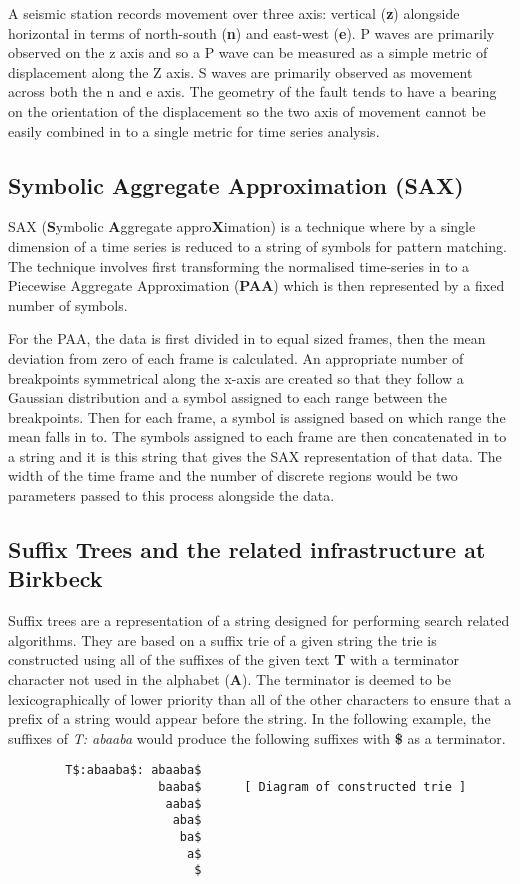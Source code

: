 \documentclass[11pt]{scrartcl}
\begin{document}
	A seismic station records movement over three axis: vertical (\textbf{z}) alongside horizontal in terms of north-south (\textbf{n}) and east-west (\textbf{e}).  P waves are primarily observed on the z axis and so a P wave can be measured as a simple metric of displacement along the Z axis.  S waves are primarily observed as movement across both the n and e axis.  The geometry of the fault tends to have a bearing on the orientation of the displacement so the two axis of movement cannot be easily combined in to a single metric for time series analysis.
	
\subsection{Symbolic Aggregate Approximation (SAX)}
	SAX (\textbf{S}ymbolic \textbf{A}ggregate appro\textbf{X}imation) \citep{sax} is a technique where by a single dimension of a time series is reduced to a string of symbols for pattern matching.  The technique involves first transforming the normalised time-series in to a Piecewise Aggregate Approximation (\textbf{PAA}) which is then represented by a fixed number of symbols.
	
	For the PAA, the data is first divided in to equal sized frames, then the mean deviation from zero of each frame is calculated.  An appropriate number of breakpoints symmetrical along the x-axis are created so that they follow a Gaussian distribution and a symbol assigned to each range between the breakpoints.  Then for each frame, a symbol is assigned based on which range the mean falls in to.  The symbols assigned to each frame are then concatenated in to a string and it is this string that gives the SAX representation of that data.  The width of the time frame and the number of discrete regions would be two parameters passed to this process alongside the data.
	
\subsection{Suffix Trees and the related infrastructure at Birkbeck}
	Suffix trees are a representation of a string designed for performing search related algorithms.  They are based on a suffix trie of a given string the trie is constructed using all of the suffixes of the given text \textbf{T} with a terminator character not used in the alphabet (\textbf{A}).  The terminator is deemed to be lexicographically of lower priority than all of the other characters to ensure that a prefix of a string would appear before the string. In the following example, the suffixes of \textit{T: abaaba} would produce the following suffixes with \textbf{\$} as a terminator.
	\begin{verbatim}
		T$:abaaba$: abaaba$
		             baaba$      [ Diagram of constructed trie ]
		              aaba$
		               aba$
		                ba$
		                 a$
		                  $
	\end{verbatim}
	
\end{document}
